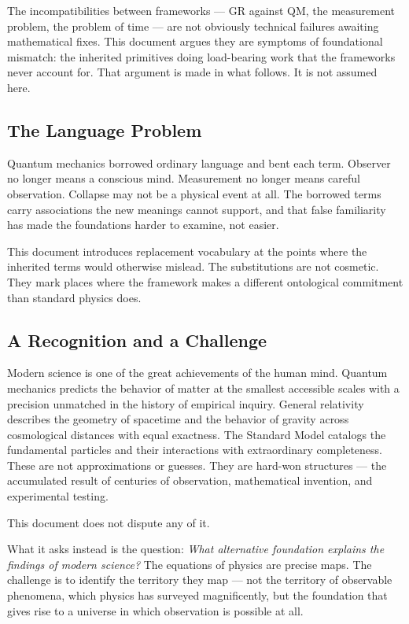 \documentclass[11pt,letterpaper]{article}
\begin{document}
The incompatibilities between frameworks — GR against QM, the measurement problem, the problem of time — are not obviously technical failures awaiting mathematical fixes. This document argues they are symptoms of foundational mismatch: the inherited primitives doing load-bearing work that the frameworks never account for. That argument is made in what follows. It is not assumed here.

\subsection{The Language Problem}
\label{sec:org7aceed4}

Quantum mechanics borrowed ordinary language and bent each term. Observer no longer means a conscious mind. Measurement no longer means careful observation. Collapse may not be a physical event at all. The borrowed terms carry associations the new meanings cannot support, and that false familiarity has made the foundations harder to examine, not easier.

This document introduces replacement vocabulary at the points where the inherited terms would otherwise mislead. The substitutions are not cosmetic. They mark places where the framework makes a different ontological commitment than standard physics does.

\subsection{A Recognition and a Challenge}
\label{sec:orga0451d1}

Modern science is one of the great achievements of the human mind. Quantum mechanics predicts the behavior of matter at the smallest accessible scales with a precision unmatched in the history of empirical inquiry. General relativity describes the geometry of spacetime and the behavior of gravity across cosmological distances with equal exactness. The Standard Model catalogs the fundamental particles and their interactions with extraordinary completeness. These are not approximations or guesses. They are hard-won structures --- the accumulated result of centuries of observation, mathematical invention, and experimental testing.

This document does not dispute any of it.

What it asks instead is the question: \emph{What alternative foundation explains the findings of modern science?} The equations of physics are precise maps. The challenge is to identify the territory they map --- not the territory of observable phenomena, which physics has surveyed magnificently, but the foundation that gives rise to a universe in which observation is possible at all.
\end{document}
